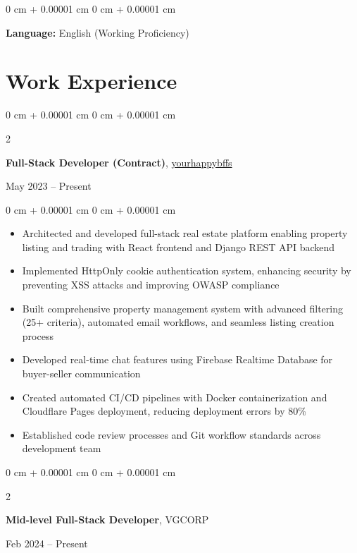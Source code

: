\documentclass[10pt, letterpaper]{article}
\newenvironment{highlights}{
    \begin{itemize}[
        topsep=0.10 cm,
        parsep=0.10 cm,
        partopsep=0pt,
        itemsep=0pt,
        leftmargin=0 cm + 10pt
    ]
}{
    \end{itemize}
} %
\newenvironment{onecolentry}{
    \begin{adjustwidth}{
        0 cm + 0.00001 cm
    }{
        0 cm + 0.00001 cm
    }
}{
    \end{adjustwidth}
} %
\newenvironment{twocolentry}[2][]{
    \onecolentry
    \def\secondColumn{#2}
    \setcolumnwidth{\fill, 4.5 cm}
    \begin{paracol}{2}
}{
    \switchcolumn \raggedleft \secondColumn
    \end{paracol}
    \endonecolentry
} %
\begin{document}
        \vspace{0.2 cm}

        \begin{onecolentry}
            \textbf{Language:} English (Working Proficiency)
        \end{onecolentry}

    \section{Work Experience}

        \begin{twocolentry}{
            May 2023 – Present
        }
            \textbf{Full-Stack Developer (Contract)}, \href{https://www.linkedin.com/company/yourhappybffs}{yourhappybffs}
        \end{twocolentry}

        \vspace{0.15 cm}
        \begin{onecolentry}
            \begin{highlights}
                \item Architected and developed full-stack real estate platform enabling property listing and trading with React frontend and Django REST API backend
                \item Implemented HttpOnly cookie authentication system, enhancing security by preventing XSS attacks and improving OWASP compliance
                \item Built comprehensive property management system with advanced filtering (25+ criteria), automated email workflows, and seamless listing creation process
                \item Developed real-time chat features using Firebase Realtime Database for buyer-seller communication
                \item Created automated CI/CD pipelines with Docker containerization and Cloudflare Pages deployment, reducing deployment errors by 80\%
                \item Established code review processes and Git workflow standards across development team
            \end{highlights}
        \end{onecolentry}

        \vspace{0.2 cm}

        \begin{twocolentry}{
            Feb 2024 – Present
        }
            \textbf{Mid-level Full-Stack Developer}, VGCORP
        \end{twocolentry}
\end{document}
